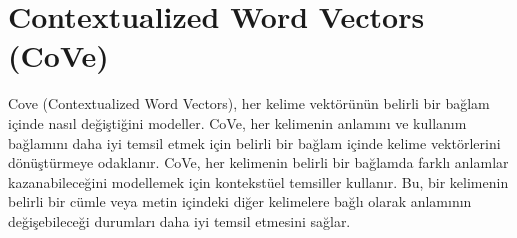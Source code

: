 \section{Contextualized Word Vectors (CoVe)}
Cove (Contextualized Word Vectors), her kelime vektörünün belirli bir bağlam içinde nasıl değiştiğini modeller. CoVe, her kelimenin anlamını ve kullanım bağlamını daha iyi temsil etmek için belirli bir bağlam içinde kelime vektörlerini dönüştürmeye odaklanır. CoVe, her kelimenin belirli bir bağlamda farklı anlamlar kazanabileceğini modellemek için kontekstüel temsiller kullanır. Bu, bir kelimenin belirli bir cümle veya metin içindeki diğer kelimelere bağlı olarak anlamının değişebileceği durumları daha iyi temsil etmesini sağlar.

\newpage